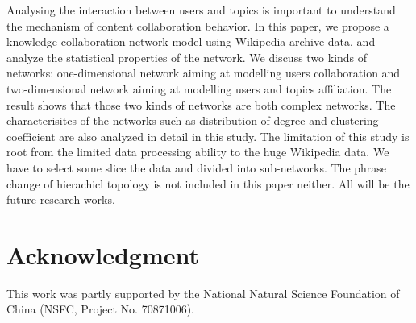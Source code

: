 \documentclass{elsarticle}
\begin{document}
Analysing the interaction between users and topics is important to
understand the mechanism of content collaboration behavior. 
In this paper, we propose a knowledge collaboration network model
using  Wikipedia archive data, and analyze the statistical
properties of the network. We discuss two kinds of networks:
one-dimensional network aiming at modelling users collaboration and
two-dimensional network aiming at modelling users and topics
affiliation. The result shows that those two kinds of networks are
both complex networks. The characterisitcs of the networks such as
distribution of degree and clustering coefficient are also analyzed in
detail in this study. The limitation of this study is root from the
limited data processing ability to the
huge Wikipedia data. We have to select some slice the data and divided
into sub-networks. The
phrase change of hierachicl topology is  not included in this paper
neither. All will be the future research works.  


\section*{Acknowledgment}
\label{sec:acknowledgment}
This work was partly supported by the National Natural Science Foundation of China (NSFC, Project No. 70871006).




\end{document}
